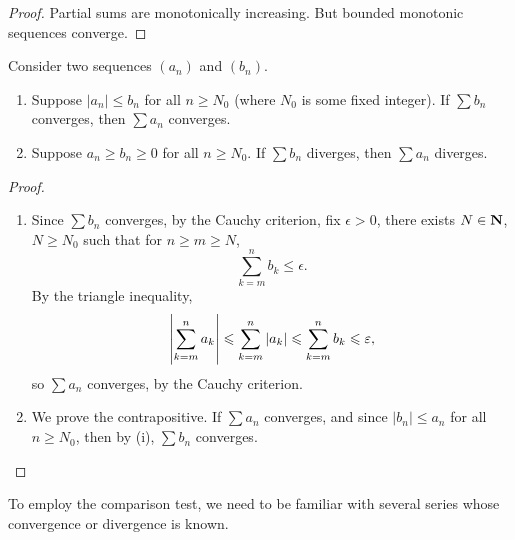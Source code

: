 \begin{proof}
Partial sums are monotonically increasing. But bounded monotonic sequences converge.
\end{proof}

\begin{lemma}\label{lemma:comparison-test}
Consider two sequences $(a_n)$ and $(b_n)$.
\begin{enumerate}[label=(\roman*)]
\item Suppose $|a_n|\le b_n$ for all $n\ge N_0$ (where $N_0$ is some fixed integer). If $\sum b_n$ converges, then $\sum a_n$ converges.
\item Suppose $a_n\ge b_n\ge0$ for all $n\ge N_0$. If $\sum b_n$ diverges, then $\sum a_n$ diverges.
\end{enumerate}
\end{lemma}

\begin{proof} \
\begin{enumerate}[label=(\roman*)]
\item Since $\sum b_n$ converges, by the Cauchy criterion, fix $\epsilon>0$, there exists $N\in\mathbf N$, $N\ge N_0$ such that for $n\ge m\ge N$,
\[\sum_{k=m}^{n}b_k\le\epsilon.\]
By the triangle inequality,
\[\left|\sum_{k=m}^{n}a_k\right|\leqslant\sum_{k=m}^{n}|a_k|\leqslant\sum_{k=m}^{n}b_k\leqslant\varepsilon,\]
so $\sum a_n$ converges, by the Cauchy criterion.

\item We prove the contrapositive. If $\sum a_n$ converges, and since $|b_n|\le a_n$ for all $n\ge N_0$, then by (i), $\sum b_n$ converges.
\end{enumerate}
\end{proof}

To employ the comparison test, we need to be familiar with several series whose convergence or divergence is known.

